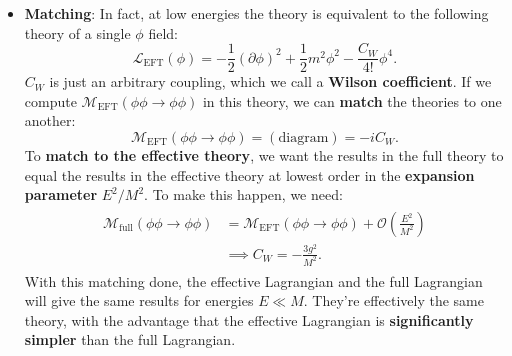 \documentclass[12pt, oneside]{article}   	%
\theoremstyle{definition}
\begin{document}
\begin{itemize}
	
	\item \textbf{Matching}: In fact, at low energies the theory is equivalent to the following theory of a single $\phi$ field:
	\begin{equation}
		\mathcal L_\mathrm{EFT}(\phi) =  -\frac{1}{2}(\partial\phi)^2 + \frac{1}{2} m^2\phi^2 - \frac{C_W}{4!} \phi^4. \label{eq:eft_lagrangian}
	\end{equation}
	$C_W$ is just an arbitrary coupling, which we call a \textbf{Wilson coefficient}. If we compute $\mathcal M_\mathrm{EFT}(\phi\phi\rightarrow\phi\phi)$ in this theory, we can \textbf{match} the theories to one another:
	\begin{equation}
		\mathcal M_\mathrm{EFT}(\phi\phi\rightarrow\phi\phi) = (\mathrm{diagram}) = -iC_W.
	\end{equation}
	To \textbf{match to the effective theory}, we want the results in the full theory to equal the results in the effective theory at lowest order in the \textbf{expansion parameter} $E^2 / M^2$. To make this happen, we need:
	\begin{align} \begin{split}
		\mathcal M_\mathrm{full}(\phi\phi\rightarrow\phi\phi) &= \mathcal M_\mathrm{EFT}(\phi\phi\rightarrow\phi\phi) + \mathcal O\left(\frac{E^2}{M^2}\right) \\
		&\implies C_W = - \frac{3g^2}{M^2}.
	\end{split} \end{align}
	With this matching done, the effective Lagrangian and the full Lagrangian will give the same results for energies $E\ll M$. They're effectively the same theory, with the advantage that the effective Lagrangian is \textbf{significantly simpler} than the full Lagrangian. 
	
	

\end{itemize}
\end{document}

